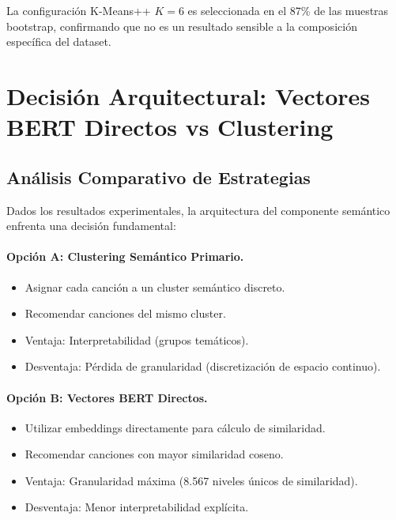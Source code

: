 La configuración K-Means++ $K=6$ es seleccionada en el 87\% de las muestras bootstrap, confirmando que no es un resultado sensible a la composición específica del dataset.

\section{Decisión Arquitectural: Vectores BERT Directos vs Clustering}
\label{sec:decision-arquitectural}

\subsection{Análisis Comparativo de Estrategias}
\label{subsec:comparativo-estrategias}

Dados los resultados experimentales, la arquitectura del componente semántico enfrenta una decisión fundamental:

\paragraph{Opción A: Clustering Semántico Primario.}
\begin{itemize}
    \item Asignar cada canción a un cluster semántico discreto.
    \item Recomendar canciones del mismo cluster.
    \item Ventaja: Interpretabilidad (grupos temáticos).
    \item Desventaja: Pérdida de granularidad (discretización de espacio continuo).
\end{itemize}

\paragraph{Opción B: Vectores BERT Directos.}
\begin{itemize}
    \item Utilizar embeddings directamente para cálculo de similaridad.
    \item Recomendar canciones con mayor similaridad coseno.
    \item Ventaja: Granularidad máxima (8.567 niveles únicos de similaridad).
    \item Desventaja: Menor interpretabilidad explícita.
\end{itemize}

